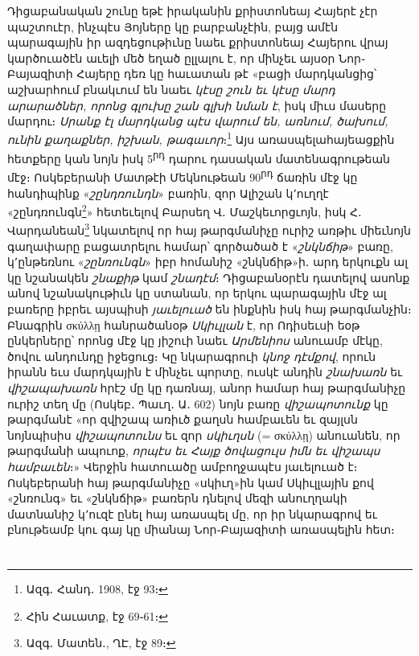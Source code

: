 \documentclass{article}
\begin{document}
{Դիցաբանական շունը եթէ իրականին քրիստոնեայ Հայերէ չէր պաշտուէր, ինչպէս Յոյները կը բարբանչէին, բայց ամէն պարագային իր ազդեցութիւնը նաեւ քրիստոնեայ Հայերու վրայ կարծուածէն աւելի մեծ եղած ըլլալու է, որ մինչեւ այսօր Նոր֊Բայազիտի Հայերը դեռ կը հաւատան թէ «բացի մարդկանցից՝ աշխարհում բնակւում են նաեւ \emph{կէսը շուն եւ կէսը մարդ արարածներ, որոնց գլուխը շան գլխի նման է}, իսկ միւս մասերը մարդու։ \emph{Սրանք էլ մարդկանց պէս վարում են, առնում, ծախում, ունին քաղաքներ, իշխան, թագաւոր}։\footnote{Ազգ․ Հանդ․ 1908, էջ 93։} Այս առասպելահայեացքին հետքերը կան նոյն իսկ 5\textsuperscript{րդ} դարու դասական մատենագրութեան մէջ։ Ոսկեբերանի Մատթէի Մեկնութեան 90\textsuperscript{րդ} ճառին մէջ կը հանդիպինք «\emph{շընդռունդն}» բառին, զոր Ալիշան կ՚ուղղէ «շընդռունգն\footnote{Հին Հաւատք, էջ 69֊61։}» հետեւելով Բարսեղ Վ․ Մաշկեւորցւոյն, իսկ Հ․ Վարդանեան\footnote{Ազգ․ Մատեն․, ՂԷ, էջ 89։} նկատելով որ հայ թարգմանիչը ուրիշ առթիւ միեւնոյն գաղափարը բացատրելու համար՝ գործածած է «\emph{շնկնճիթ}» բառը, կ՚ընթեռնու «\emph{շընռունգն}» իբր հոմանիշ «շնկնճիթ»ի․ արդ երկուքն ալ կը նշանակեն \emph{շնաքիթ} կամ \emph{շնադէմ}։ Դիցաբանօրէն դատելով ասոնք անով նշանակութիւն կը ստանան, որ երկու պարագային մէջ ալ բառերը իբրեւ այսպիսի \emph{յաւելուած} են ինքնին իսկ հայ թարգմանչին։ Բնագրին σκύλλῃ հանրածանօթ \emph{Սկիւլլան} է, որ Ոդիսեւսի եօթ ընկերները՝ որոնց մէջ կը յիշուի նաեւ \emph{Արմենիոս} անուամբ մէկը, ծովու անդունդը իջեցուց։ Կը նկարագրուի \emph{կնոջ դէմքով}, որուն իրանն եւս մարդկային է մինչեւ պորտը, ուսկէ անդին \emph{շնախառն} եւ \emph{վիշապախառն} հրէշ մը կը դառնայ, անոր համար հայ թարգմանիչը ուրիշ տեղ մը (Ոսկեբ․ Պաւղ․ Ա․ 602) նոյն բառը \emph{վիշապոտունք} կը թարգմանէ «որ զվիշապ առիւծ քաղսն համբաւեն եւ զայլսն նոյնպիսիս \emph{վիշապոտունս} եւ զոր \emph{սկիւղսն} (= σκύλλῃ) անուանեն, որ թարգմանի ապուոք, \emph{որպէս եւ Հայք ծովացուլս իմն եւ վիշապս համբաւեն}։» Վերջին հատուածը ամբողջապէս յաւելուած է։ Ոսկեբերանի հայ թարգմանիչը «սկիւղ»ին կամ Սկիւլլային քով «շնռունգ» եւ «շնկնճիթ» բառերն դնելով մեզի անուղղակի մատնանիշ կ՚ուզէ ընել հայ առասպել մը, որ իր նկարագրով եւ բնութեամբ կու գայ կը միանայ Նոր֊Բայազիտի առասպելին հետ։}
\clearpage
\section{}
\subsection{}
\end{document}
